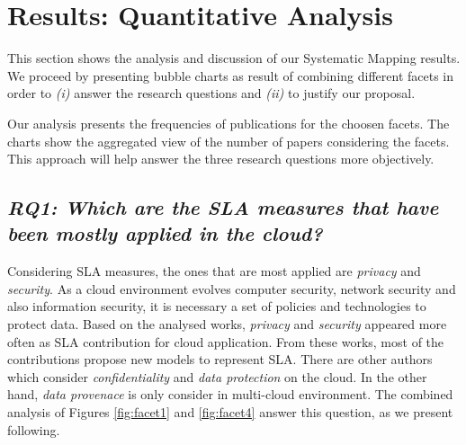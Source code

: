 \section{Results: Quantitative Analysis}\label{sec:qanalysis}

This section shows the analysis and discussion of our Systematic Mapping results.
We proceed by presenting bubble charts as result of combining different facets in order to 
\textit{(i)} answer the research questions and \textit{(ii)} to justify our proposal.

Our analysis presents the frequencies of publications for
the choosen facets. The charts show the aggregated view of the number of papers 
considering the facets. This approach will help answer the three research
questions more objectively.

 
\subsection{\textit{RQ1: Which are the SLA measures that have been mostly
applied  in the cloud?}}

Considering SLA measures, the ones that are most applied are \textit{privacy}
and \textit{security}. As a cloud environment evolves computer
security, network security and also information security, it is necessary
a set of policies and technologies to protect data. Based on the analysed works,
\textit{privacy} and \textit{security} appeared more often as SLA contribution
for cloud application. From these works, most of the contributions propose new
models to represent SLA. There are other authors which consider
\textit{confidentiality} and \textit{data protection} on the cloud. In the other
hand, \textit{data provenace} is only consider in multi-cloud environment.
The combined analysis of Figures \ref{fig:facet1} and \ref{fig:facet4} answer
this question, as we present following.

